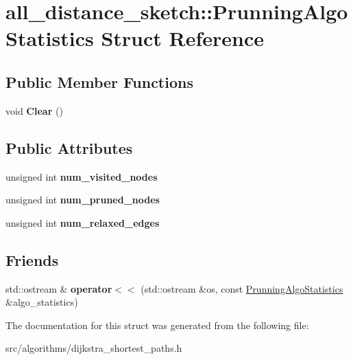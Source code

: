 \hypertarget{structall__distance__sketch_1_1PrunningAlgoStatistics}{}\section{all\+\_\+distance\+\_\+sketch\+:\+:Prunning\+Algo\+Statistics Struct Reference}
\label{structall__distance__sketch_1_1PrunningAlgoStatistics}
\subsection*{Public Member Functions}
\begin{DoxyCompactItemize}
\item 
\hypertarget{structall__distance__sketch_1_1PrunningAlgoStatistics_a948354ddf74d7c8dc08212008f410c86}{}void {\bfseries Clear} ()\label{structall__distance__sketch_1_1PrunningAlgoStatistics_a948354ddf74d7c8dc08212008f410c86}

\end{DoxyCompactItemize}
\subsection*{Public Attributes}
\begin{DoxyCompactItemize}
\item 
\hypertarget{structall__distance__sketch_1_1PrunningAlgoStatistics_af9b6b181016da7a2274cf36b851d59f9}{}unsigned int {\bfseries num\+\_\+visited\+\_\+nodes}\label{structall__distance__sketch_1_1PrunningAlgoStatistics_af9b6b181016da7a2274cf36b851d59f9}

\item 
\hypertarget{structall__distance__sketch_1_1PrunningAlgoStatistics_a14afee83f6779594bcd6ce8fd4934248}{}unsigned int {\bfseries num\+\_\+pruned\+\_\+nodes}\label{structall__distance__sketch_1_1PrunningAlgoStatistics_a14afee83f6779594bcd6ce8fd4934248}

\item 
\hypertarget{structall__distance__sketch_1_1PrunningAlgoStatistics_af869f2bb10452af1f34143f274e7c3c6}{}unsigned int {\bfseries num\+\_\+relaxed\+\_\+edges}\label{structall__distance__sketch_1_1PrunningAlgoStatistics_af869f2bb10452af1f34143f274e7c3c6}

\end{DoxyCompactItemize}
\subsection*{Friends}
\begin{DoxyCompactItemize}
\item 
\hypertarget{structall__distance__sketch_1_1PrunningAlgoStatistics_af854d6b4715656b916a18946cfadb849}{}std\+::ostream \& {\bfseries operator$<$$<$} (std\+::ostream \&os, const \hyperlink{structall__distance__sketch_1_1PrunningAlgoStatistics}{Prunning\+Algo\+Statistics} \&algo\+\_\+statistics)\label{structall__distance__sketch_1_1PrunningAlgoStatistics_af854d6b4715656b916a18946cfadb849}

\end{DoxyCompactItemize}


The documentation for this struct was generated from the following file\+:\begin{DoxyCompactItemize}
\item 
src/algorithms/dijkstra\+\_\+shortest\+\_\+paths.\+h\end{DoxyCompactItemize}

